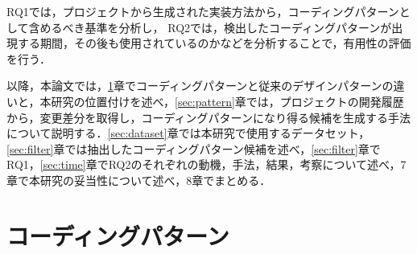 \documentclass[11pt]{jreport}
\newcommand{\todo}[1]{\colorbox{yellow}{{\bf TODO}:}{\color{red} {\textbf{[#1]}}}}
\begin{document}
RQ1では，プロジェクトから生成された実装方法から，コーディングパターンとして含めるべき基準を分析し，
RQ2では，検出したコーディングパターンが出現する期間，その後も使用されているのかなどを分析することで，有用性の評価を行う．

以降，本論文では，\ref{sec:related}章でコーディングパターンと従来のデザインパターンの違いと，本研究の位置付けを述べ，\ref{sec:pattern}章では，プロジェクトの開発履歴から，変更差分を取得し，コーディングパターンになり得る候補を生成する手法について説明する．\ref{sec:dataset}章では本研究で使用するデータセット，\ref{sec:filter}章では抽出したコーディングパターン候補を述べ，\ref{sec:filter}章でRQ1，\ref{sec:time}章でRQ2のそれぞれの動機，手法，結果，考察について述べ，7章で本研究の妥当性について述べ，8章でまとめる．

\chapter{コーディングパターン}\label{sec:related}
\end{document}
